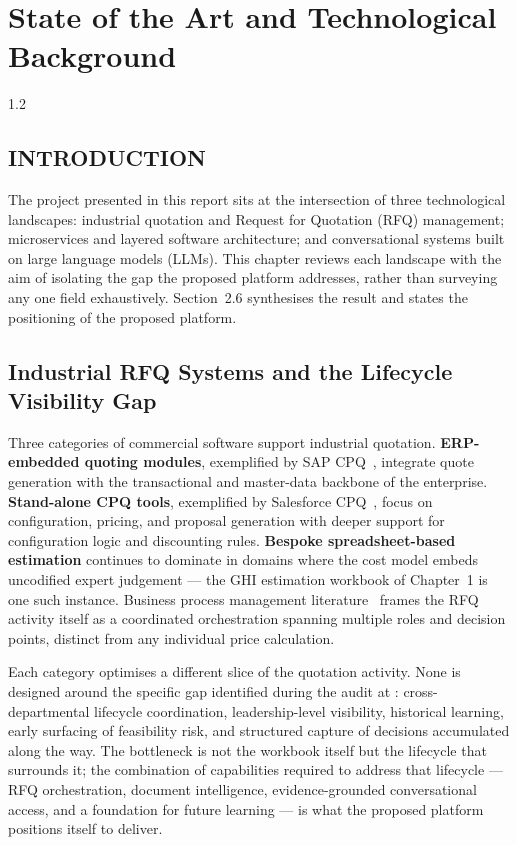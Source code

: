 \chapter[State of the Art]{State of the Art and Technological Background}
\begin{spacing}{1.2}
\minitoc
\thispagestyle{MyStyle}
\end{spacing}
\newpage

\section*{INTRODUCTION}
The project presented in this report sits at the intersection of three technological landscapes: industrial quotation and Request for Quotation (RFQ) management; microservices and layered software architecture; and conversational systems built on large language models (LLMs). This chapter reviews each landscape with the aim of isolating the gap the proposed platform addresses, rather than surveying any one field exhaustively. Section~2.6 synthesises the result and states the positioning of the proposed platform.

\section{Industrial RFQ Systems and the Lifecycle Visibility Gap}
Three categories of commercial software support industrial quotation. \textbf{ERP-embedded quoting modules}, exemplified by SAP CPQ~\cite{sap_cpq_product}, integrate quote generation with the transactional and master-data backbone of the enterprise. \textbf{Stand-alone CPQ tools}, exemplified by Salesforce CPQ~\cite{salesforce_cpq_docs}, focus on configuration, pricing, and proposal generation with deeper support for configuration logic and discounting rules. \textbf{Bespoke spreadsheet-based estimation} continues to dominate in domains where the cost model embeds uncodified expert judgement --- the GHI estimation workbook of Chapter~1 is one such instance. Business process management literature~\cite{dumas2018bpm} frames the RFQ activity itself as a coordinated orchestration spanning multiple roles and decision points, distinct from any individual price calculation.

Each category optimises a different slice of the quotation activity. None is designed around the specific gap identified during the audit at \clientCompany: cross-departmental lifecycle coordination, leadership-level visibility, historical learning, early surfacing of feasibility risk, and structured capture of decisions accumulated along the way. The bottleneck is not the workbook itself but the lifecycle that surrounds it; the combination of capabilities required to address that lifecycle --- RFQ orchestration, document intelligence, evidence-grounded conversational access, and a foundation for future learning --- is what the proposed platform positions itself to deliver.

